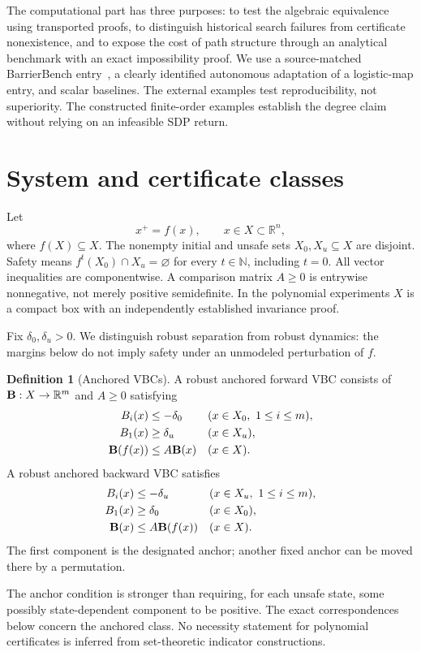 \documentclass[5p,times]{elsarticle}
\theoremstyle{definition}\newtheorem{definition}[theorem]{Definition}
\theoremstyle{remark}\newtheorem{remark}[theorem]{Remark}
\newcommand{\R}{\mathbb R}\newcommand{\N}{\mathbb N}
\begin{document}
The computational part has three purposes: to test the algebraic equivalence using transported proofs, to distinguish historical search failures from certificate nonexistence, and to expose the cost of path structure through an analytical benchmark with an exact impossibility proof. We use a source-matched BarrierBench entry~\cite{barrierbench,data}, a clearly identified autonomous adaptation of a logistic-map entry, and scalar baselines. The external examples test reproducibility, not superiority. The constructed finite-order examples establish the degree claim without relying on an infeasible SDP return.

\section{System and certificate classes}
Let
\begin{equation}\label{eq:system}
 x^+=f(x),\qquad x\in X\subset\R^n,
\end{equation}
where $f(X)\subseteq X$. The nonempty initial and unsafe sets $X_0,X_u\subseteq X$ are disjoint. Safety means $f^t(X_0)\cap X_u=\varnothing$ for every $t\in\N$, including $t=0$. All vector inequalities are componentwise. A comparison matrix $A\ge0$ is entrywise nonnegative, not merely positive semidefinite. In the polynomial experiments $X$ is a compact box with an independently established invariance proof.

Fix $\delta_0,\delta_u>0$. We distinguish robust separation from robust dynamics: the margins below do not imply safety under an unmodeled perturbation of $f$.
\begin{definition}[Anchored VBCs]\label{def:vbc}
A robust anchored forward VBC consists of $\B:X\to\R^m$ and $A\ge0$ satisfying
\begin{subequations}\label{eq:fv}
\begin{align}
 B_i(x)&\le-\delta_0 &&(x\in X_0,\ 1\le i\le m),\\
 B_1(x)&\ge\delta_u &&(x\in X_u),\\
 \mathbf B(f(x))&\le A\mathbf B(x) &&(x\in X).
\end{align}
\end{subequations}
A robust anchored backward VBC satisfies
\begin{subequations}\label{eq:bv}
\begin{align}
 B_i(x)&\le-\delta_u &&(x\in X_u,\ 1\le i\le m),\\
 B_1(x)&\ge\delta_0 &&(x\in X_0),\\
 \mathbf B(x)&\le A\mathbf B(f(x)) &&(x\in X).
\end{align}
\end{subequations}
The first component is the designated anchor; another fixed anchor can be moved there by a permutation.
\end{definition}
The anchor condition is stronger than requiring, for each unsafe state, some possibly state-dependent component to be positive. The exact correspondences below concern the anchored class. No necessity statement for polynomial certificates is inferred from set-theoretic indicator constructions.
\end{document}
